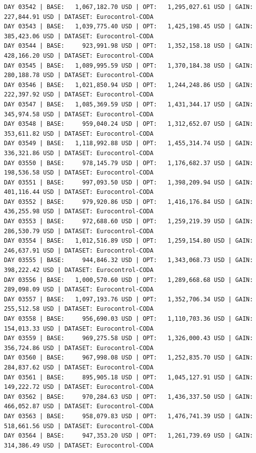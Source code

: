 \documentclass[11pt,a4paper]{article}
\begin{document}
\begin{verbatim}
DAY 03542 | BASE:   1,067,182.70 USD | OPT:   1,295,027.61 USD | GAIN: 227,844.91 USD | DATASET: Eurocontrol-CODA
DAY 03543 | BASE:   1,039,775.40 USD | OPT:   1,425,198.45 USD | GAIN: 385,423.06 USD | DATASET: Eurocontrol-CODA
DAY 03544 | BASE:     923,991.98 USD | OPT:   1,352,158.18 USD | GAIN: 428,166.20 USD | DATASET: Eurocontrol-CODA
DAY 03545 | BASE:   1,089,995.59 USD | OPT:   1,370,184.38 USD | GAIN: 280,188.78 USD | DATASET: Eurocontrol-CODA
DAY 03546 | BASE:   1,021,850.94 USD | OPT:   1,244,248.86 USD | GAIN: 222,397.92 USD | DATASET: Eurocontrol-CODA
DAY 03547 | BASE:   1,085,369.59 USD | OPT:   1,431,344.17 USD | GAIN: 345,974.58 USD | DATASET: Eurocontrol-CODA
DAY 03548 | BASE:     959,040.24 USD | OPT:   1,312,652.07 USD | GAIN: 353,611.82 USD | DATASET: Eurocontrol-CODA
DAY 03549 | BASE:   1,118,992.88 USD | OPT:   1,455,314.74 USD | GAIN: 336,321.86 USD | DATASET: Eurocontrol-CODA
DAY 03550 | BASE:     978,145.79 USD | OPT:   1,176,682.37 USD | GAIN: 198,536.58 USD | DATASET: Eurocontrol-CODA
DAY 03551 | BASE:     997,093.50 USD | OPT:   1,398,209.94 USD | GAIN: 401,116.44 USD | DATASET: Eurocontrol-CODA
DAY 03552 | BASE:     979,920.86 USD | OPT:   1,416,176.84 USD | GAIN: 436,255.98 USD | DATASET: Eurocontrol-CODA
DAY 03553 | BASE:     972,688.60 USD | OPT:   1,259,219.39 USD | GAIN: 286,530.79 USD | DATASET: Eurocontrol-CODA
DAY 03554 | BASE:   1,012,516.89 USD | OPT:   1,259,154.80 USD | GAIN: 246,637.91 USD | DATASET: Eurocontrol-CODA
DAY 03555 | BASE:     944,846.32 USD | OPT:   1,343,068.73 USD | GAIN: 398,222.42 USD | DATASET: Eurocontrol-CODA
DAY 03556 | BASE:   1,000,570.60 USD | OPT:   1,289,668.68 USD | GAIN: 289,098.09 USD | DATASET: Eurocontrol-CODA
DAY 03557 | BASE:   1,097,193.76 USD | OPT:   1,352,706.34 USD | GAIN: 255,512.58 USD | DATASET: Eurocontrol-CODA
DAY 03558 | BASE:     956,690.03 USD | OPT:   1,110,703.36 USD | GAIN: 154,013.33 USD | DATASET: Eurocontrol-CODA
DAY 03559 | BASE:     969,275.58 USD | OPT:   1,326,000.43 USD | GAIN: 356,724.86 USD | DATASET: Eurocontrol-CODA
DAY 03560 | BASE:     967,998.08 USD | OPT:   1,252,835.70 USD | GAIN: 284,837.62 USD | DATASET: Eurocontrol-CODA
DAY 03561 | BASE:     895,905.18 USD | OPT:   1,045,127.91 USD | GAIN: 149,222.72 USD | DATASET: Eurocontrol-CODA
DAY 03562 | BASE:     970,284.63 USD | OPT:   1,436,337.50 USD | GAIN: 466,052.87 USD | DATASET: Eurocontrol-CODA
DAY 03563 | BASE:     958,079.83 USD | OPT:   1,476,741.39 USD | GAIN: 518,661.56 USD | DATASET: Eurocontrol-CODA
DAY 03564 | BASE:     947,353.20 USD | OPT:   1,261,739.69 USD | GAIN: 314,386.49 USD | DATASET: Eurocontrol-CODA

\end{verbatim}
\end{document}
